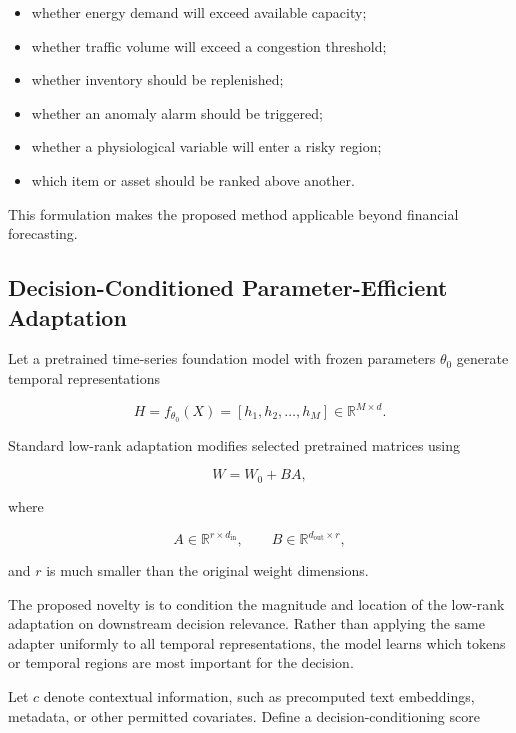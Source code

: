 \documentclass[11pt]{article}
\newcommand{\R}{\mathbb{R}}
\begin{document}
\begin{itemize}
    \item whether energy demand will exceed available capacity;
    \item whether traffic volume will exceed a congestion threshold;
    \item whether inventory should be replenished;
    \item whether an anomaly alarm should be triggered;
    \item whether a physiological variable will enter a risky region;
    \item which item or asset should be ranked above another.
\end{itemize}

This formulation makes the proposed method applicable beyond financial
forecasting.

\subsection{Decision-Conditioned Parameter-Efficient Adaptation}

Let a pretrained time-series foundation model with frozen parameters
$\theta_0$ generate temporal representations

\begin{equation}
H
=
f_{\theta_0}(X)
=
\left[
h_1,
h_2,
\ldots,
h_M
\right]
\in
\R^{M\times d}.
\end{equation}

Standard low-rank adaptation modifies selected pretrained matrices using

\begin{equation}
W
=
W_0 + BA,
\end{equation}

where

\begin{equation}
A\in\R^{r\times d_{\mathrm{in}}},
\qquad
B\in\R^{d_{\mathrm{out}}\times r},
\end{equation}

and $r$ is much smaller than the original weight dimensions.

The proposed novelty is to condition the magnitude and location of the
low-rank adaptation on downstream decision relevance. Rather than applying the
same adapter uniformly to all temporal representations, the model learns which
tokens or temporal regions are most important for the decision.

Let $c$ denote contextual information, such as precomputed text embeddings,
metadata, or other permitted covariates. Define a decision-conditioning score
\end{document}
